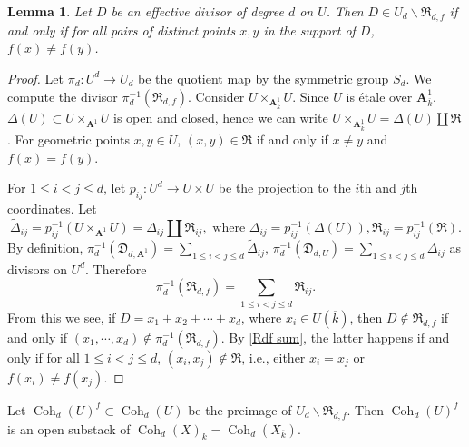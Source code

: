 \documentclass[reqno]{amsart}
\numberwithin{equation}{section}
\newcommand{\wt}[1]{\widetilde{#1}}
\newcommand{\A}{\mathbf{A}}
\newcommand{\bs}{\backslash}
\DeclareMathOperator{\Coh}{Coh}
\newcommand{\ov}{\overline}
\newcommand\D\Delta
\newcommand\frD{\mathfrak{D}}
\newcommand\frR{\mathfrak{R}}
\newtheorem{lemma}[thm]{Lemma}
\theoremstyle{remark}
\numberwithin{equation}{section}
\begin{document}
\begin{lemma}\label{l:not in R}
Let $D$ be an effective divisor of degree $d$ on $U$. Then $D\in U_{d}\bs \frR_{d,f}$ if and only if for all pairs of distinct points $x,y$ in the support of $D$, $f(x)\ne f(y)$. 
\end{lemma}
\begin{proof}
Let $\pi_{d}: U^{d}\to U_{d}$ be the quotient map by the symmetric group $S_{d}$. We compute the divisor $\pi_{d}^{-1}(\frR_{d,f})$. Consider $U\times_{\A^{1}_{\ov k}} U$. Since $U$ is \'etale over $\A^{1}_{\ov k}$, $\D(U)\subset U\times_{\A^{1}} U$ is open and closed, hence we can write $U\times_{\A^{1}_{\ov k}}U=\D(U)\coprod \frR$. For geometric points $x,y\in U$,  $(x,y)\in \frR$ if and only if $x\ne y$ and $f(x)=f(y)$. 

For $1\le i<j\le d$, let $p_{ij}: U^{d}\to U\times U$ be the projection to the $i$th and $j$th coordinates. Let 
$$\wt\D_{ij}=p_{ij}^{-1}(U\times_{\A^{1}}U)=\D_{ij}\coprod \frR_{ij}, \mbox{ where }\D_{ij}=p_{ij}^{-1}(\D(U)), \frR_{ij}=p_{ij}^{-1}(\frR).$$ 
By definition, $\pi_{d}^{-1}(\frD_{d,\A^{1}})=\sum_{1\le i< j\le d}\wt\D_{ij}$, $\pi_{d}^{-1}(\frD_{d,U})=\sum_{1\le i< j\le d}\D_{ij}$ as divisors on $U^{d}$. Therefore
\begin{equation}\label{Rdf sum}
\pi_{d}^{-1}(\frR_{d,f})=\sum_{1\le i< j\le d}\frR_{ij}.
\end{equation}
From this we see, if $D=x_{1}+x_{2}+\cdots+x_{d}$, where $x_{i}\in U(\ov k)$, then $D\notin \frR_{d,f}$ if and only if $(x_{1},\cdots, x_{d})\notin \pi_{d}^{-1}(\frR_{d,f})$. By \eqref{Rdf sum}, the latter happens if and only if for all $1\le i<j\le d$, $(x_{i},x_{j})\notin \frR$, i.e., either $x_{i}=x_{j}$ or $f(x_{i})\ne f(x_{j})$. 
\end{proof}




Let $\Coh_{d}(U)^{f}\subset \Coh_{d}(U)$ be the preimage of $U_{d}\bs \frR_{d,f}$.  Then $\Coh_{d}(U)^{f}$ is an open substack of $\Coh_{d}(X)_{\ov k}=\Coh_{d}(X_{\ov k})$.
\end{document}
